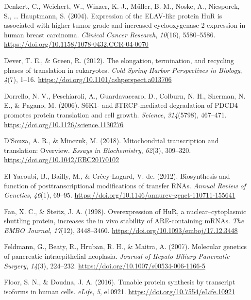 \documentclass[12pt,openany]{book}
\begin{document}
\hypertarget{ref-Denkert2004}{}
Denkert, C., Weichert, W., Winzer, K.-J., Müller, B.-M., Noske, A.,
Niesporek, S., \ldots{} Hauptmann, S. (2004). Expression of the
ELAV-like protein HuR is associated with higher tumor grade and
increased cyclooxygenase-2 expression in human breast carcinoma.
\emph{Clinical Cancer Research}, \emph{10}(16), 5580--5586.
\url{https://doi.org/10.1158/1078-0432.CCR-04-0070}

\hypertarget{ref-Dever2012}{}
Dever, T. E., \& Green, R. (2012). The elongation, termination, and
recycling phases of translation in eukaryotes. \emph{Cold Spring Harbor
Perspectives in Biology}, \emph{4}(7), 1--16.
\url{https://doi.org/10.1101/cshperspect.a013706}

\hypertarget{ref-Dorrello2006}{}
Dorrello, N. V., Peschiaroli, A., Guardavaccaro, D., Colburn, N. H.,
Sherman, N. E., \& Pagano, M. (2006). S6K1- and ßTRCP-mediated
degradation of PDCD4 promotes protein translation and cell growth.
\emph{Science}, \emph{314}(5798), 467--471.
\url{https://doi.org/10.1126/science.1130276}

\hypertarget{ref-DSouza2018}{}
D'Souza, A. R., \& Minczuk, M. (2018). Mitochondrial transcription and
translation: Overview. \emph{Essays in Biochemistry}, \emph{62}(3),
309--320. \url{https://doi.org/10.1042/EBC20170102}

\hypertarget{ref-ElYacoubi2012}{}
El Yacoubi, B., Bailly, M., \& Crécy-Lagard, V. de. (2012). Biosynthesis
and function of posttranscriptional modifications of transfer RNAs.
\emph{Annual Review of Genetics}, \emph{46}(1), 69--95.
\url{https://doi.org/10.1146/annurev-genet-110711-155641}

\hypertarget{ref-Fan1998}{}
Fan, X. C., \& Steitz, J. A. (1998). Overexpression of HuR, a
nuclear--cytoplasmic shuttling protein, increases the in vivo stability
of ARE-containing mRNAs. \emph{The EMBO Journal}, \emph{17}(12),
3448--3460. \url{https://doi.org/10.1093/emboj/17.12.3448}

\hypertarget{ref-Feldmann2007}{}
Feldmann, G., Beaty, R., Hruban, R. H., \& Maitra, A. (2007). Molecular
genetics of pancreatic intraepithelial neoplasia. \emph{Journal of
Hepato-Biliary-Pancreatic Surgery}, \emph{14}(3), 224--232.
\url{https://doi.org/10.1007/s00534-006-1166-5}

\hypertarget{ref-Floor2016}{}
Floor, S. N., \& Doudna, J. A. (2016). Tunable protein synthesis by
transcript isoforms in human cells. \emph{eLife}, \emph{5}, e10921.
\url{https://doi.org/10.7554/eLife.10921}
\end{document}
